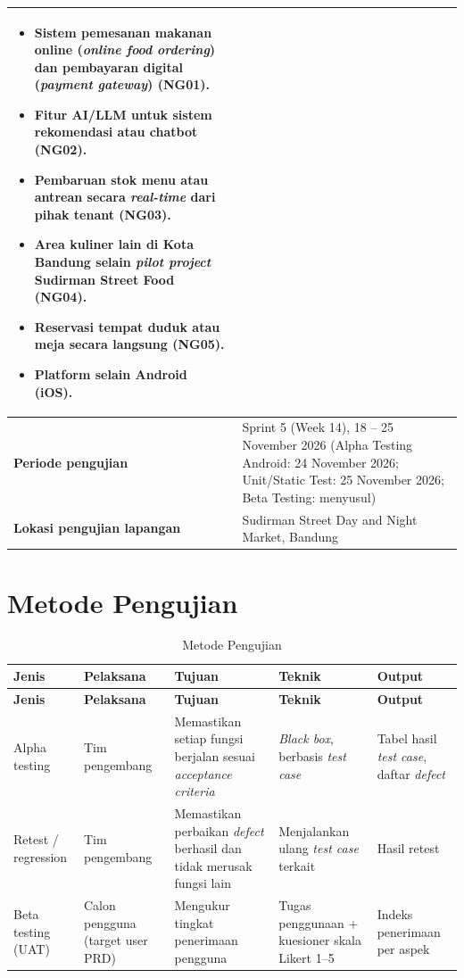 \begin{longtable}{|L{0.28}|L{0.72}|}
\begin{itemize}
  \item Sistem pemesanan makanan online (\textit{online food ordering}) dan pembayaran digital (\textit{payment gateway}) (NG01).
  \item Fitur AI/LLM untuk sistem rekomendasi atau chatbot (NG02).
  \item Pembaruan stok menu atau antrean secara \textit{real-time} dari pihak tenant (NG03).
  \item Area kuliner lain di Kota Bandung selain \textit{pilot project} Sudirman Street Food (NG04).
  \item Reservasi tempat duduk atau meja secara langsung (NG05).
  \item Platform selain Android (iOS).
\end{itemize} \\ \hline
\textbf{Periode pengujian} & Sprint 5 (Week 14), 18 -- 25 November 2026 (Alpha Testing Android: 24 November 2026; Unit/Static Test: 25 November 2026; Beta Testing: menyusul) \\ \hline
\textbf{Lokasi pengujian lapangan} & Sudirman Street Day and Night Market, Bandung \\ \hline
\end{longtable}

\section{Metode Pengujian}

\begin{longtable}{|L{0.17}|L{0.17}|L{0.26}|L{0.20}|L{0.20}|}
\caption{Metode Pengujian}\\
\hline
{}\textbf{Jenis} & \textbf{Pelaksana} & \textbf{Tujuan} & \textbf{Teknik} & \textbf{Output} \\ \hline
\endfirsthead
\hline
{}\textbf{Jenis} & \textbf{Pelaksana} & \textbf{Tujuan} & \textbf{Teknik} & \textbf{Output} \\ \hline
\endhead
Alpha testing & Tim pengembang & Memastikan setiap fungsi berjalan sesuai \textit{acceptance criteria} & \textit{Black box}, berbasis \textit{test case} & Tabel hasil \textit{test case}, daftar \textit{defect} \\ \hline
Retest / regression & Tim pengembang & Memastikan perbaikan \textit{defect} berhasil dan tidak merusak fungsi lain & Menjalankan ulang \textit{test case} terkait & Hasil retest \\ \hline
Beta testing (UAT) & Calon pengguna (target user PRD) & Mengukur tingkat penerimaan pengguna & Tugas penggunaan + kuesioner skala Likert 1--5 & Indeks penerimaan per aspek \\ \hline
\end{longtable}

